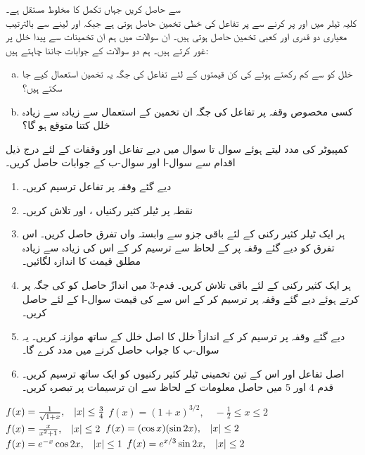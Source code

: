 سے حاصل کریں جہاں  تکمل کا مخلوط مستقل ہے۔
\\
کلیہ ٹیلر میں  اور  پر کرنے سے  پر تفاعل کی خطی تخمین حاصل ہوتی ہے جبکہ  اور  لینے سے بالترتیب معیاری دو قدری اور کعبی تخمین حاصل ہوتی ہیں۔ ان سوالات میں ہم ان تخمینات سے پیدا خلل پر غور کرتے ہیں۔ ہم دو سوالات کے جوابات جاننا چاہتے ہیں:
\begin{enumerate}[a.]
\item
خلل کو  سے کم رکھتے ہوئے  کی کن قیمتوں کے لئے تفاعل کی جگہ یہ تخمین استعمال کیے جا سکتے ہیں؟
\item
کسی مخصوص وقفہ پر تفاعل کی جگہ ان تخمین کے استعمال سے زیادہ سے زیادہ خلل کتنا متوقع ہو گا؟
\end{enumerate}
کمپیوٹر کی مدد لیتے ہوئے سوال  تا سوال  میں دیے تفاعل اور وقفات کے لئے  درج ذیل اقدام سے سوال-ا اور سوال-ب کے جوابات حاصل کریں۔
\begin{enumerate}[1.]
\item
دیے گئے وقفہ پر تفاعل ترسیم کریں۔
\item
نقطہ  پر ٹیلر کثیر رکنیاں ،  اور  تلاش کریں۔ 
\item
ہر ایک ٹیلر کثیر رکنی کے لئے باقی جزو سے وابستہ   واں تفرق  حاصل کریں۔ اس تفرق کو دیے گئے وقفہ پر   کے لحاظ سے ترسیم کر کے اس کی زیادہ سے زیادہ مطلق قیمت  کا اندازہ لگائیں۔
\item
ہر ایک کثیر رکنی کے لئے باقی  تلاش کریں۔ قدم-3 میں اندازً حاصل  کو  کی جگہ پر کرتے ہوئے دیے گئے وقفہ پر  ترسیم کر کے اس سے  کی قیمت  سوال-ا  کے لئے حاصل کریں۔
\item
دیے گئے وقفہ پر  ترسیم کر کے  اندازاً خلل کا اصل خلل  کے ساتھ موازنہ کریں۔ یہ سوال-ب کا جواب حاصل کرنے میں مدد کرے گا۔
\item
اصل تفاعل اور اس کے تین تخمینی ٹیلر کثیر رکنیوں کو ایک ساتھ ترسیم کریں۔قدم 4 اور 5 میں حاصل معلومات کے لحاظ سے ان ترسیمات پر تبصرہ کریں۔

\end{enumerate}

$f(x)=\tfrac{1}{\sqrt{1+x}},\quad \abs{x}\le \tfrac{3}{4}$
$f(x)=(1+x)^{3/2},\quad -\tfrac{1}{2}\le x\le 2$
$f(x)=\tfrac{x}{x^2+1},\quad \abs{x}\le 2$
$f(x)=(\cos x)(\sin 2x),\quad \abs{x}\le 2$
$f(x)=e^{-x}\cos 2x,\quad \abs{x}\le 1$
$f(x)=e^{x/3}\sin 2x,\quad \abs{x}\le 2$
